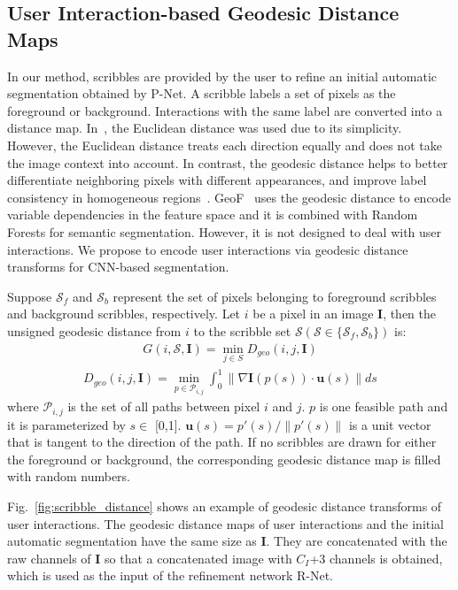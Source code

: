 \documentclass[10pt,journal,compsoc]{IEEEtran}
\begin{document}
\subsection{User Interaction-based Geodesic Distance Maps}\label{method:user_interaction}
In our method, scribbles are provided by the user to refine an initial automatic segmentation obtained by P-Net. A scribble labels a set of pixels as the foreground or background. Interactions with the same label are converted into a distance map. In~\cite{Xu2016}, the Euclidean distance was used due to its simplicity. However, the Euclidean distance treats each direction equally and does not take the image context into account. In contrast, the geodesic distance helps to better differentiate neighboring pixels with different appearances, and improve label consistency in homogeneous regions~\cite{Criminisi2008}. GeoF~\cite{Kohli2013} uses the geodesic distance to encode variable dependencies in the feature space and it is combined with Random Forests for semantic segmentation. However, it is not designed to deal with user interactions. We propose to encode user interactions via geodesic distance transforms for CNN-based segmentation. 


Suppose $\mathcal S_f$ and $\mathcal S_b$ represent the set of pixels belonging to foreground scribbles and background scribbles,  respectively. Let $i$ be a pixel in an image $\mathbf{I}$, then the unsigned geodesic distance from $i$ to the scribble set $\mathcal S (\mathcal S \in \{\mathcal S_f, \mathcal S_b\})$ is:
\begin{align}
G(i,\mathcal S,\mathbf{I}) = \min_{j\in S}{D_{geo}(i,j,\mathbf{I})}
\label{eq:dis}
\end{align}
\begin{align}
D_{geo}(i, j,\mathbf{I})= \min_{p \in \mathcal{P}_{i,j}}
{\int_0^1 \|\nabla \mathbf{I}(p(s)) \cdot \mathbf{u}(s)\| ds}
\label{eq:geodis}
\end{align}
 where $\mathcal{P}_{i,j}$ is the set of all paths between pixel $i$ and $j$. $p$ is one feasible path and it is parameterized by $s\in$ [0,1]. $\mathbf{u}(s) = p'(s)/\|p'(s)\|$ is a unit vector that is tangent to the direction of the path. If no scribbles are drawn for either the foreground or background, the corresponding geodesic distance map is filled with random numbers.


Fig.~\ref{fig:scribble_distance} shows an example of geodesic distance transforms of user interactions. The geodesic distance maps of user interactions and the initial automatic segmentation have the same size as $\mathbf{I}$. They are concatenated with the raw channels of $\mathbf{I}$ so that a concatenated image with $C_I$+3 channels is obtained, which is used as the input of the refinement network R-Net.
\end{document}
